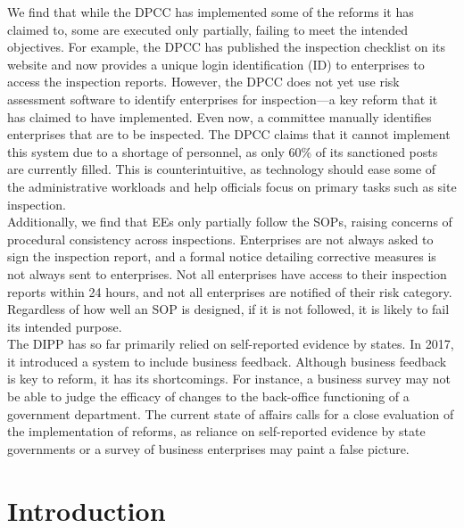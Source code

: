 \documentclass[a4paper, 12pt]{article}
\begin{document}
                 We find that while the DPCC has implemented some of the reforms it has claimed to, some are executed only partially, failing to meet the intended objectives. For example, the DPCC has published the inspection checklist on its website and now provides a unique login identification (ID) to enterprises to access the inspection reports. However, the DPCC does not yet use risk assessment software to identify enterprises for inspection—a key reform that it has claimed to have implemented. Even now, a committee manually identifies enterprises that are to be inspected. The DPCC claims that it cannot implement this system due to a shortage of personnel, as only 60\% of its sanctioned posts are currently filled. This is counterintuitive, as technology should ease some of the administrative workloads and help officials focus on primary tasks such as site inspection. \\
                 
                 Additionally, we find that EEs only partially follow the SOPs, raising concerns of procedural consistency across inspections. Enterprises are not always asked to sign the inspection report, and a formal notice detailing corrective measures is not always sent to enterprises. Not all enterprises have access to their inspection reports within 24 hours, and not all enterprises are notified of their risk category. Regardless of how well an SOP is designed, if it is not followed, it is likely to fail its intended purpose. \\
                 
                  The DIPP has so far primarily relied on self-reported evidence by states. In 2017, it introduced a system to include business feedback. Although business feedback is key to reform, it has its shortcomings. For instance, a business survey may not be able to judge the efficacy of changes to the back-office functioning of a government department. The current state of affairs calls for a close evaluation of the implementation of reforms, as reliance on self-reported evidence by state governments or a survey of business enterprises may paint a false picture. \\
                  
                    \newpage
                    \section{Introduction}
                    
\end{document}
